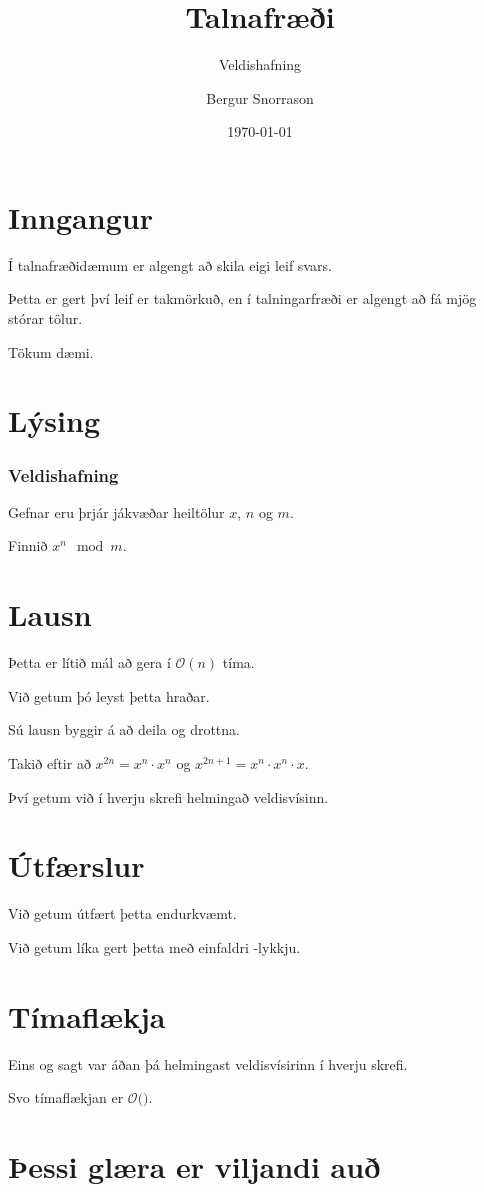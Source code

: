 \title{Talnafræði}
\subtitle{Veldishafning}
\author{Bergur Snorrason}
\date{\today}



\frame{\titlepage}

\section{Inngangur}
{
    {
        \item<1-> Í talnafræðidæmum er algengt að skila eigi leif svars.
        \item<2-> Þetta er gert því leif er takmörkuð, en í talningarfræði er algengt að fá mjög stórar tölur.
        \item<3-> Tökum dæmi.
    }
}

\section{Lýsing}
{
    \frametitle{Veldishafning}
    {
        \item<1-> Gefnar eru þrjár jákvæðar heiltölur $x$, $n$ og $m$.
        \item<2-> Finnið $x^n \mod m$.
    }
}

\section{Lausn}
{
    {
        \item<1-> Þetta er lítið mál að gera í $\mathcal{O}(n)$ tíma.
        \item<2->[] 
        \item<3-> Við getum þó leyst þetta hraðar.
        \item<4-> Sú lausn byggir á að deila og drottna.
        \item<5-> Takið eftir að $x^{2n} = x^n \cdot x^n$ og $x^{2n + 1} = x^n \cdot x^n \cdot x$.
        \item<6-> Því getum við í hverju skrefi helmingað veldisvísinn.
    }
}

\section{Útfærslur}
{
    {
        \item<1-> Við getum útfært þetta endurkvæmt.
        \item<2->[] 
        \item<3-> Við getum líka gert þetta með einfaldri -lykkju.
        \item<4->[] 
    }
}

\section{Tímaflækja}
{
    {
        \item<1-> Eins og sagt var áðan þá helmingast veldisvísirinn í hverju skrefi.
        \item<2-> Svo tímaflækjan er $\mathcal{O}($$)$.
    }
}

\section{Þessi glæra er viljandi auð}
{
}


